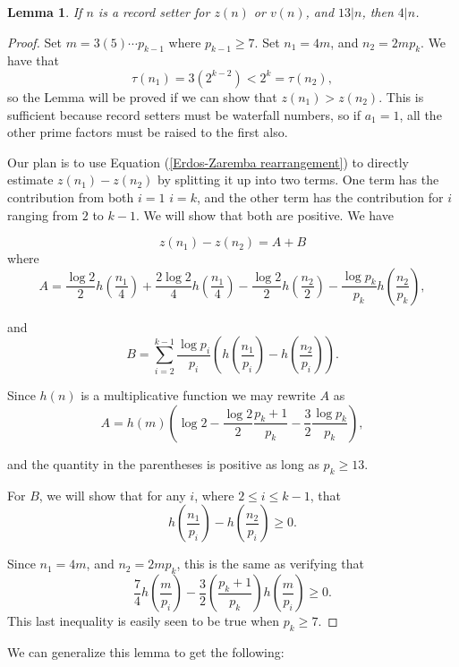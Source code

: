 \documentclass{article}
\newtheorem{lemma}[theorem]{Lemma}
\begin{document}
\begin{lemma} If $n$ is a record setter for $z(n)$ or $v(n)$, and $13|n$, then $4|n$.
\end{lemma}
\begin{proof} 
Set $m=3(5)\cdots p_{k-1}$ where $p_{k-1} \geq 7$. Set
$n_1= 4m$, and $n_2=2mp_k$. We have that $$\tau(n_1) = 3 (2^{k-2}) < 2^k = \tau(n_2),$$ so the Lemma will be proved if we can show that
$z(n_1) > z(n_2).$ This is sufficient because record setters must be waterfall numbers, so if $a_1=1$, all the other prime factors must be raised to the first also.

Our plan is to use Equation (\ref{Erdos-Zaremba rearrangement})  to directly estimate $z(n_1)-z(n_2)$ by splitting it up into two terms. One term has the contribution from both $i=1$ $i=k$, and the other term has the contribution for $i$ ranging from $2$ to $k-1$. We will show that both are positive. We have 

$$z(n_1) - z(n_2) = A+B$$
where $$A= \frac{\log 2}{2}h\left(\frac{n_1}{4}\right) + \frac{2\log2}{4}h\left(\frac{n_1}{4}\right) - \frac{\log 2}{2}h\left(\frac{n_2}{2}\right) - \frac{\log p_k}{p_k}h\left(\frac{n_2}{p_k}\right),  $$

and $$B= \sum_{i=2}^{k-1} \frac{\log p_i}{p_i}\left(h\left(\frac{n_1}{p_i}\right) -h\left(\frac{n_2}{p_i}\right)\right). $$

Since $h(n)$ is a multiplicative function we may rewrite $A$ as 
$$A=h(m)\left(\log 2 - \frac{\log 2}{2} \frac{p_k+1}{p_k} - \frac{3}{2} \frac{\log p_k}{p_k} \right),$$

and the quantity in the parentheses is positive as long as $p_k \geq 13$.

For $B$, we will show that for any $i$, where $2 \leq i \leq k-1$,
that $$h\left(\frac{n_1}{p_i}\right) - h\left(\frac{n_2}{p_i}\right) \geq 0.$$

Since $n_1 = 4m$, and $n_2 = 2mp_k$, this is the same as verifying that 
$$\frac{7}{4}h\left(\frac{m}{p_i}\right) - \frac{3}{2}\left(\frac{p_k+1}{p_k}\right)h\left(\frac{m}{p_i}\right) \geq 0.$$ This last inequality is easily seen to be true when $p_k \geq 7$.

\end{proof}

We can generalize this lemma to get the following:
\end{document}
